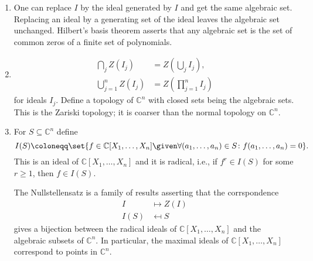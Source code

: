 \begin{enumerate}[label=(\arabic*)]
	\item One can replace $I$ by the ideal generated by $I$ and get the same
		algebraic set. Replacing an ideal by a generating set of the ideal leaves
		the algebraic set unchanged. Hilbert's basis theorem asserts that any
		algebraic set is the set of common zeros of a finite set of polynomials.

	\item
		\begin{align*}
			\bigcap_j Z(I_j) &= Z(\bigcup_j I_j),\\
			\bigcup_{j = 1}^nZ(I_j) &= Z(\prod_{j = 1}^nI_j)
		\end{align*}
		for ideals $I_j$. Define a topology of $\mathbb{C}^n$ with closed sets
		being the algebraic sets. This is the Zariski topology; it is coarser than
		the normal topology on $\mathbb{C}^n$.

	\item For $S \subseteq \mathbb{C}^n$ define
		\[ I(S) \coloneqq \set{f  \in \mathbb{C}[X_1, \ldots, X_n]\given \forall (a_1, \ldots, a_n) \in S\colon f(a_1, \ldots, a_n) = 0}. \]
		This is an ideal of $\mathbb{C}[X_1, \ldots, X_n]$ and it is radical, i.e.,
		if $f^r \in I(S)$ for some $r\geq 1$, then $f \in I(S)$.

		The Nullstellensatz is a family of results asserting that the corrspondence
		\begin{align*}
			I &\mapsto Z(I)\\
			I(S) &\mapsfrom S
		\end{align*}
		gives a bijection between the radical ideals of $\mathbb{C}[X_1, \ldots, X_n]$ and the
		algebraic subsets of $\mathbb{C}^n$. In particular, the maximal ideals of
		$\mathbb{C}[X_1, \ldots, X_n]$ correspond to points in $\mathbb{C}^n$.
\end{enumerate}
